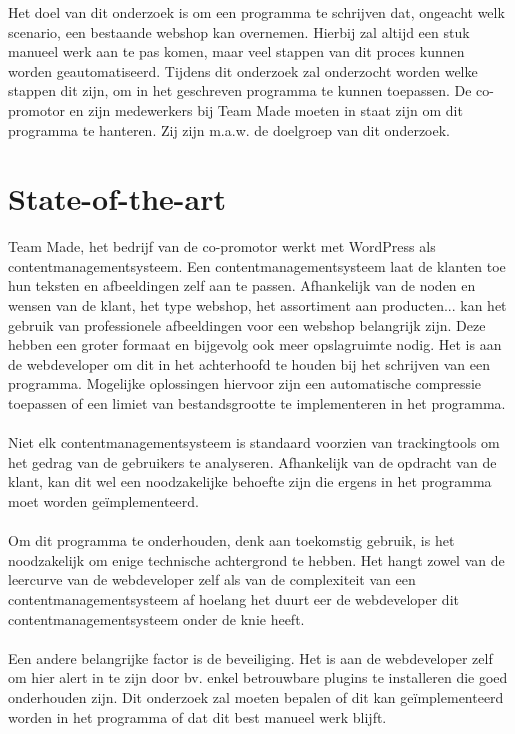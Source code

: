 Het doel van dit onderzoek is om een programma te schrijven dat, ongeacht welk scenario, een bestaande webshop kan overnemen.
Hierbij zal altijd een stuk manueel werk aan te pas komen, maar veel stappen van dit proces kunnen worden geautomatiseerd.
Tijdens dit onderzoek zal onderzocht worden welke stappen dit zijn, om in het geschreven programma te kunnen toepassen.
De co-promotor en zijn medewerkers bij Team Made moeten in staat zijn om dit programma te hanteren. Zij zijn m.a.w. de doelgroep van dit onderzoek.  


\section{State-of-the-art}%
\label{sec:state-of-the-art}

Team Made, het bedrijf van de co-promotor werkt met WordPress als contentmanagementsysteem. Een contentmanagementsysteem laat de klanten toe hun teksten en afbeeldingen zelf aan te passen. Afhankelijk van de noden en wensen van de klant, het type webshop, het assortiment aan producten... kan het gebruik van professionele afbeeldingen voor een webshop belangrijk zijn. Deze hebben een groter formaat en bijgevolg ook meer opslagruimte nodig. Het is aan de webdeveloper om dit in het achterhoofd te houden bij het schrijven van een programma. Mogelijke oplossingen hiervoor zijn een automatische compressie toepassen of een limiet van bestandsgrootte te implementeren in het programma. \autocite{LatumenRonaldDekker2004}
\\\\
Niet elk contentmanagementsysteem is standaard voorzien van trackingtools om het gedrag van de gebruikers te analyseren. Afhankelijk van de opdracht van de klant, kan dit wel een noodzakelijke behoefte zijn die ergens in het programma moet worden geïmplementeerd. \autocite{DeBruijn2013}
\\\\ 
Om dit programma te onderhouden, denk aan toekomstig gebruik, is het noodzakelijk om enige technische achtergrond te hebben. Het hangt zowel van de leercurve van de webdeveloper zelf als van de complexiteit van een contentmanagementsysteem af hoelang het duurt eer de webdeveloper dit contentmanagementsysteem onder de knie heeft. \autocite{DriesBlanchaert2022}
\\\\
Een andere belangrijke factor is de beveiliging. Het is aan de webdeveloper zelf om hier alert in te zijn door bv. enkel betrouwbare plugins te installeren die goed onderhouden zijn. Dit onderzoek zal moeten bepalen of dit kan geïmplementeerd worden in het programma of dat dit best manueel werk blijft.  \autocite{Bottelbergs2013}    


